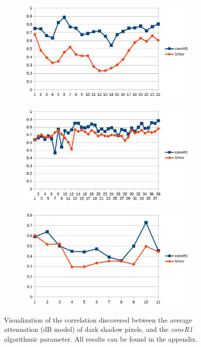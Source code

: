 \documentclass[12pt]{report}
\begin{document}
\begin{figure}
  \centering
  \begin{subfigure}{1\linewidth}
  \includegraphics[width=1\linewidth]{figures/correlations/db/room_hsv.jpg}
  \caption{}
\end{subfigure}
\hfill
\begin{subfigure}{.49\linewidth}
  \includegraphics[width=1\linewidth]{figures/correlations/db/campus_hsv.jpg}
  \caption{}
\end{subfigure}
\begin{subfigure}{.49\linewidth}
  \includegraphics[width=1\linewidth]{figures/correlations/db/pets2_hsv.jpg}
  \caption{}
\end{subfigure}

\caption{Visualization of the correlation discovered between the average attenuation (dB model) of dark shadow pixels, and the \textit{coneR1} algorithmic parameter. All results can be found in the appendix.}
\label{fig:corr_db}
\end{figure}
\end{document}
